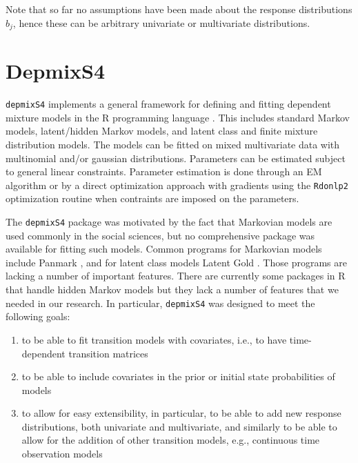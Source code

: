 \documentclass[a4paper,12pt,man]{apa} %
\newcommand{\citep}{\cite}
\newcommand{\pkg}{\texttt}
\newcommand{\code}{\texttt}
\begin{document}
Note that so far no assumptions have been made about the response
distributions $b_{j}$, hence these can be arbitrary univariate or
multivariate distributions.


\section{DepmixS4}

\pkg{depmixS4} implements a general framework for defining and fitting
dependent mixture models in the R programming language \citep{R2008}.
This includes standard Markov models, latent/hidden Markov models, and
latent class and finite mixture distribution models.  The models can
be fitted on mixed multivariate data with multinomial and/or gaussian
distributions.  Parameters can be estimated subject to general linear
constraints.  Parameter estimation is done through an EM algorithm or
by a direct optimization approach with gradients using the
\code{Rdonlp2} optimization routine when contraints are imposed on the
parameters.

The \pkg{depmixS4} package was motivated by the fact that Markovian
models are used commonly in the social sciences, but no comprehensive
package was available for fitting such models.  Common programs for
Markovian models include Panmark \citep{Pol1996}, and for latent class
models Latent Gold \citep{Vermunt2003}.  Those programs are lacking a
number of important features.  There are currently some packages in R
that handle hidden Markov models but they lack a number of features
that we needed in our research.  In particular, \pkg{depmixS4} was
designed to meet the following goals:
\begin{enumerate}

	\item to be able to fit transition models with covariates, i.e.,
	to have time-dependent transition matrices

	\item to be able to include covariates in the prior or initial
	state probabilities of models

	\item to allow for easy extensibility, in particular, to be able
	to add new response distributions, both univariate and
	multivariate, and similarly to be able to allow for the addition
	of other transition models, e.g., continuous time observation
	models

\end{enumerate}
\end{document}
